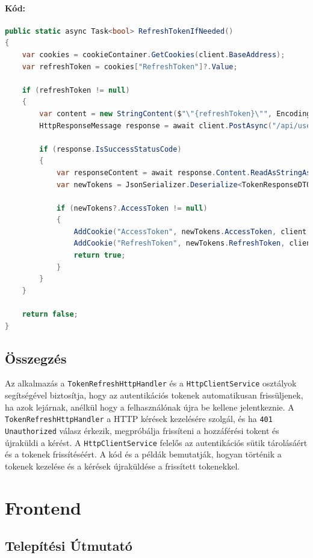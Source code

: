 \documentclass{report}[11pt]
\begin{document}
\subsubsection{Kód:}
\begin{lstlisting}[language=csharp]
public static async Task<bool> RefreshTokenIfNeeded()
{
    var cookies = cookieContainer.GetCookies(client.BaseAddress);
    var refreshToken = cookies["RefreshToken"]?.Value;

    if (refreshToken != null)
    {
        var content = new StringContent($"\"{refreshToken}\"", Encoding.UTF8, "application/json");
        HttpResponseMessage response = await client.PostAsync("/api/users/refresh", content);

        if (response.IsSuccessStatusCode)
        {
            var responseContent = await response.Content.ReadAsStringAsync();
            var newTokens = JsonSerializer.Deserialize<TokenResponseDTO>(responseContent, new JsonSerializerOptions { PropertyNameCaseInsensitive = true });

            if (newTokens?.AccessToken != null)
            {
                AddCookie("AccessToken", newTokens.AccessToken, client.BaseAddress.ToString());
                AddCookie("RefreshToken", newTokens.RefreshToken, client.BaseAddress.ToString());
                return true;
            }
        }
    }

    return false;
}
\end{lstlisting}

\section{Összegzés}
Az alkalmazás a \texttt{TokenRefreshHttpHandler} és a \texttt{HttpClientService} osztályok segítségével biztosítja, hogy az autentikációs tokenek automatikusan frissüljenek, ha azok lejárnak, anélkül hogy a felhasználónak újra be kellene jelentkeznie. A \texttt{TokenRefreshHttpHandler} a HTTP kérések kezelésére szolgál, és ha \texttt{401 Unauthorized} válasz érkezik, megpróbálja frissíteni a hozzáférési tokent és újraküldi a kérést. A \texttt{HttpClientService} felelős az autentikációs sütik tárolásáért és a tokenek frissítéséért. A kód és a példák bemutatják, hogyan történik a tokenek kezelése és a kérések újraküldése a frissített tokenekkel.

\chapter{Frontend}
\section{Telepítési Útmutató}
\end{document}
